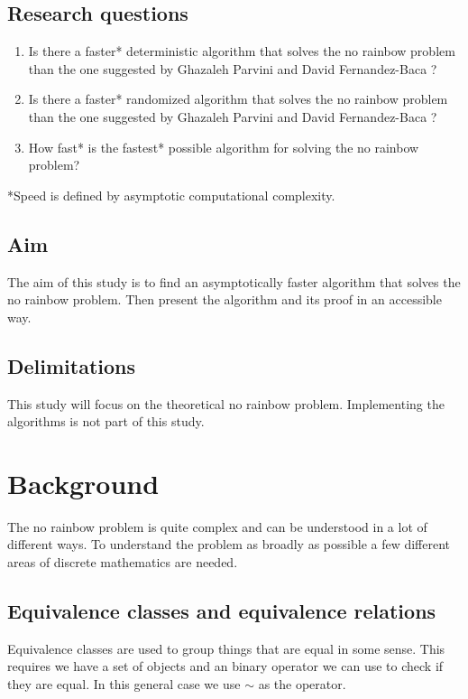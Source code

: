 \documentclass[msc,lith,english]{liuthesis}
\begin{document}
\section{Research questions}
\begin{enumerate}
  \item Is there a faster* deterministic algorithm that solves the no rainbow problem than the one suggested by Ghazaleh Parvini and David Fernandez-Baca \cite{sourceNoRainbow}?
  \item Is there a faster* randomized algorithm that solves the no rainbow problem than the one suggested by Ghazaleh Parvini and David Fernandez-Baca \cite{sourceNoRainbow}?
  \item How fast* is the fastest* possible algorithm for solving the no rainbow problem? 
\end{enumerate}
*Speed is defined by asymptotic computational complexity.

\section{Aim}
The aim of this study is to find an asymptotically faster algorithm that solves
the no rainbow problem. Then present the algorithm and its proof in an accessible way.

\section{Delimitations}
This study will focus on the theoretical no rainbow problem.
Implementing the algorithms is not part of this study.

\chapter{Background}
\label{chaBackground}
The no rainbow problem is quite complex and can be understood in a lot of different ways.
To understand the problem as broadly as possible a few different areas of discrete mathematics are needed.

\section{Equivalence classes and equivalence relations}
Equivalence classes are used to group things that are equal in some sense.
This requires we have a set of objects and an binary operator we can use to check if they are equal.
In this general case we use $\sim$ as the operator.
\end{document}

